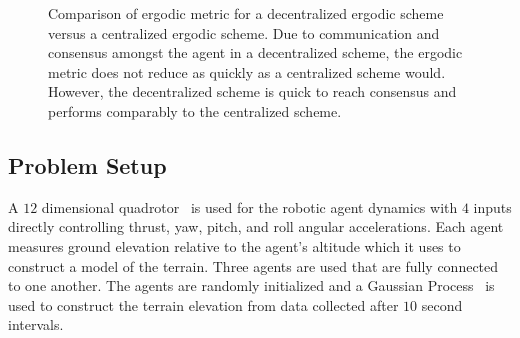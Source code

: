 \documentclass[letterpaper, 10 pt, conference]{ieeeconf}  %
\begin{document}
\begin{figure}[thpb]
\centering
{}
\caption{Comparison of ergodic metric for a decentralized ergodic scheme versus a centralized ergodic scheme. 
Due to communication and consensus amongst the agent in a decentralized scheme, the ergodic metric does not reduce as quickly as a centralized scheme would.
However, the decentralized scheme is quick to reach consensus and performs comparably to the centralized scheme.}
\label{fig:coverage_comparison}
\end{figure}

\subsection{Problem Setup}
A $12$ dimensional quadrotor~\cite{martin2010true} is used for the robotic agent dynamics with $4$ inputs directly controlling thrust, yaw, pitch, and roll angular accelerations.
Each agent measures ground elevation relative to the agent's altitude which it uses to construct a model of the terrain.
Three agents are used that are fully connected to one another.
The agents are randomly initialized and a Gaussian Process~\cite{vasudevan2009gaussian, plagemann2008learning} is used to construct the terrain elevation from data collected after $10$ second intervals.
\end{document}
